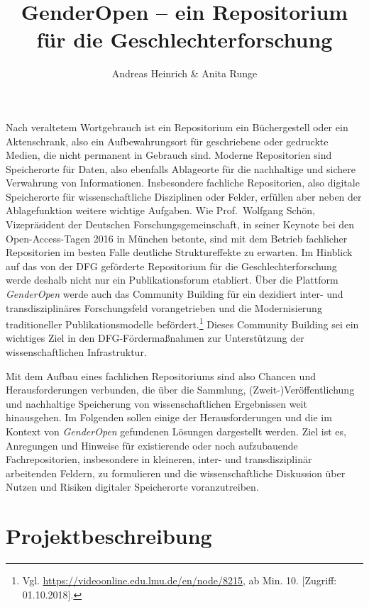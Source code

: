 \documentclass[a4paper,
fontsize=11pt,
oneside,
numbers=noperiodatend,
parskip=half-,
bibliography=totoc,
final
]{scrartcl}
\title{\LARGE{GenderOpen -- ein Repositorium für die Geschlechterforschung}}%
\author{Andreas Heinrich \& Anita Runge} %
\date{}
\begin{document}
\maketitle
\thispagestyle{fancyplain} 


Nach veraltetem Wortgebrauch ist ein Repositorium ein Büchergestell oder
ein Aktenschrank, also ein Aufbewahrungsort für geschriebene oder
gedruckte Medien, die nicht permanent in Gebrauch sind. Moderne
Repositorien sind Speicherorte für Daten, also ebenfalls Ablageorte für
die nachhaltige und sichere Verwahrung von Informationen. Insbesondere
fachliche Repositorien, also digitale Speicherorte für wissenschaftliche
Disziplinen oder Felder, erfüllen aber neben der Ablagefunktion weitere
wichtige Aufgaben. Wie Prof.~Wolfgang Schön, Vizepräsident der Deutschen
Forschungsgemeinschaft, in seiner Keynote bei den Open-Access-Tagen 2016
in München betonte, sind mit dem Betrieb fachlicher Repositorien im
besten Falle deutliche Struktureffekte zu erwarten. Im Hinblick auf das
von der DFG geförderte Repositorium für die Geschlechterforschung werde
deshalb nicht nur ein Publikationsforum etabliert. Über die Plattform
\emph{GenderOpen} werde auch das Community Building für ein dezidiert
inter- und transdisziplinäres Forschungsfeld vorangetrieben und die
Modernisierung traditioneller Publikationsmodelle befördert.\footnote{Vgl.
  \url{https://videoonline.edu.lmu.de/en/node/8215}, ab Min. 10.
  {[}Zugriff: 01.10.2018{]}.} Dieses Community Building sei ein
wichtiges Ziel in den DFG-Fördermaßnahmen zur Unterstützung der
wissenschaftlichen Infrastruktur.

Mit dem Aufbau eines fachlichen Repositoriums sind also Chancen und
Herausforderungen verbunden, die über die Sammlung,
(Zweit-)Veröffentlichung und nachhaltige Speicherung von
wissenschaftlichen Ergebnissen weit hinausgehen. Im Folgenden sollen
einige der Herausforderungen und die im Kontext von \emph{GenderOpen}
gefundenen Lösungen dargestellt werden. Ziel ist es, Anregungen und
Hinweise für existierende oder noch aufzubauende Fachrepositorien,
insbesondere in kleineren, inter- und transdisziplinär arbeitenden
Feldern, zu formulieren und die wissenschaftliche Diskussion über Nutzen
und Risiken digitaler Speicherorte voranzutreiben.

\hypertarget{projektbeschreibung}{%
\section{Projektbeschreibung}\label{projektbeschreibung}}
\end{document}
